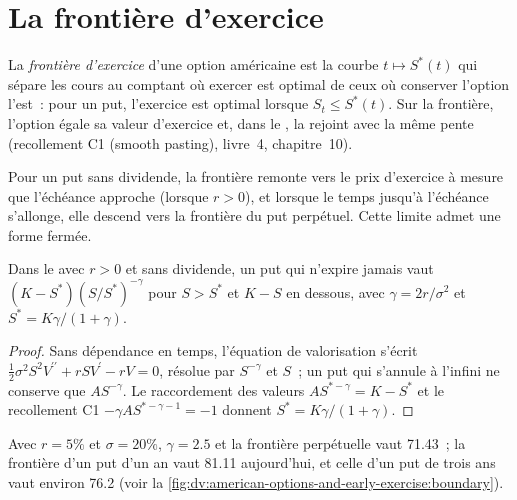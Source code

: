 \section{La frontière d'exercice}

\begin{definition}\label{def:dv:american-options-and-early-exercise:boundary}
La \emph{frontière d'exercice} d'une option américaine est la courbe
$t\mapsto S^*(t)$ qui sépare les cours au comptant où exercer est optimal de ceux où
conserver l'option l'est~: pour un put, l'exercice est optimal lorsque $S_t\le S^*(t)$. Sur la
frontière, l'option égale sa valeur d'exercice et, dans le , la rejoint avec la même
pente (recollement C1 (smooth pasting), livre~4, chapitre~10).
\end{definition}

Pour un put sans dividende, la frontière remonte vers le prix d'exercice à mesure que l'échéance approche
(lorsque $r>0$), et lorsque le temps jusqu'à l'échéance s'allonge, elle descend vers la frontière du
put perpétuel. Cette limite admet une forme fermée.

\begin{proposition}\label{prop:dv:american-options-and-early-exercise:perpetual}
Dans le  avec $r>0$ et sans dividende, un put qui n'expire jamais vaut
$(K-S^*)(S/S^*)^{-\gamma}$ pour $S>S^*$ et $K-S$ en dessous, avec $\gamma=2r/\sigma^2$ et
$S^*=K\gamma/(1+\gamma)$.
\end{proposition}
\begin{proof}
Sans dépendance en temps, l'équation de valorisation s'écrit $\tfrac12\sigma^2S^2V^{\prime\prime}+rSV^{\prime}-rV=0$,
résolue par $S^{-\gamma}$ et $S$~; un put qui s'annule à l'infini ne conserve que $AS^{-\gamma}$.
Le raccordement des valeurs $AS^{*-\gamma}=K-S^*$ et le recollement C1 $-\gamma AS^{*-\gamma-1}=-1$ donnent
$S^*=K\gamma/(1+\gamma)$.
\end{proof}

Avec $r=5\%$ et $\sigma=20\%$, $\gamma=2.5$ et la frontière perpétuelle vaut 71.43~; la
frontière d'un put d'un an vaut 81.11 aujourd'hui, et celle d'un put de trois ans vaut environ 76.2
(voir la \cref{fig:dv:american-options-and-early-exercise:boundary}).

